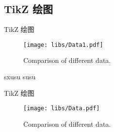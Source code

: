 \documentclass{libs/ccnu_format}
\begin{document}
\subsection{TikZ 绘图}
\begin{frame}{TikZ 绘图}

\begin{figure}
        \centering
        \texttt{[image: libs/Data1.pdf]}

        \caption{Comparison of different data.}

        \label{fig:ufc_emblem}
    \end{figure}

sxusu
susu

\end{frame}




\begin{frame}{TikZ 绘图}
    \begin{figure}
        \centering
        \texttt{[image: libs/Data.pdf]}
        \caption{Comparison of different data.}
        \label{fig:ufc_emblem}
    \end{figure}


\end{frame}

\end{document}
